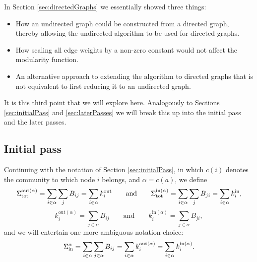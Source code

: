 \documentclass{article}
\begin{document}
In Section \ref{sec:directedGraphs} we essentially showed three 
things:
\begin{itemize}
	\item How an undirected graph could be constructed from a directed
	graph, thereby allowing the undirected algorithm to be used for 
	directed graphs.
	\item How scaling all edge weights by a non-zero constant would not 
	affect the modularity function.
	\item An alternative approach to extending the algorithm to 
	directed graphs that is not equivalent to first reducing it 
	to an undirected graph.
\end{itemize}
It is this third point that we will explore here.
Analogously to Sections \ref{sec:initialPass} and \ref{sec:laterPasses} we will 
break this up into the initial pass and the later passes.

\subsection{Initial pass}
\label{sec:initialPassDirected}

Continuing with the notation of Section \ref{sec:initialPass}, in which 
$c(i)$ denotes the community to which node $i$ belongs, 
and $\alpha = c(a)$, we define
\newcommand{\dinStot}[1]{\Sigma_{\text{tot}}^{\text{in}(#1)}}
\newcommand{\doutStot}[1]{\Sigma_{\text{tot}}^{\text{out}(#1)}}
\begin{equation}
	\doutStot{\alpha} = \sum_{i \in \alpha}\sum_{j}B_{ij} = \sum_{i \in \alpha}\dkout{i}
	\quad \quad \text{and} \quad \quad
	\dinStot{\alpha} = \sum_{i \in \alpha}\sum_{j}B_{ji} = \sum_{i \in \alpha}\dkin{i},
\end{equation}
\newcommand{\dinkin}[2]{k_{#1}^{\text{in}(#2)}}
\newcommand{\doutkin}[2]{k_{#1}^{\text{out}(#2)}}
\begin{equation}
	\doutkin{i}{\alpha} = \sum_{j \in \alpha}B_{ij}
	\quad \quad \text{and} \quad \quad
	\dinkin{i}{\alpha} = \sum_{j \in \alpha}B_{ji},
\end{equation}
and we will entertain one more ambiguous notation choice:
\begin{equation}
	\Sin{\alpha} = \sum_{i \in \alpha}\sum_{j \in \alpha}B_{ij} = \sum_{i \in \alpha}\doutkin{i}{\alpha} = \sum_{i \in \alpha}\dinkin{i}{\alpha}.
\end{equation}
\end{document}
